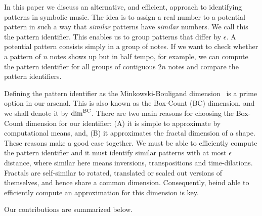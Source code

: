   In this paper we discuss an alternative, and efficient, approach to
identifying patterns in symbolic music. The idea is to assign a real
number to a potential pattern in such a way that \emph{similar}
patterns have \emph{similar} numbers. We call this the pattern
identifier.  This enables us to group patterns that differ by
$\epsilon$.  A potential pattern consists simply in a group of
notes. If we want to check whether a pattern of $n$ notes shows up but
in half tempo, for example, we can compute the pattern identifier for
all groups of contiguous $2n$ notes and compare the pattern
identifiers.  

  Defining the pattern identifier as the Minkowski-Bouligand
dimension~\cite{bouligand1928ensembles} is a prime option in our
arsenal.  This is also known as the Box-Count (BC) dimension, and we
shall denote it by $\mathrm{dim}^{\mathrm{BC}}$. There are two main reasons for choosing
the Box-Count dimension for our identifier: (A) it is simple to
approximate by computational means, and, (B) it approximates the
fractal dimension of a shape.  These reasons make a good case
together. We must be able to efficiently compute the pattern
identifier and it must identify similar patterns with at most
$\epsilon$ distance, where similar here means inversions,
transpositions and time-dilations. Fractals are self-similar to
rotated, translated or scaled out versions of themselves, and hence
share a common dimension. Consequently, beind able to efficiently
compute an approximation for this dimension is key.  







  Our contributions are summarized below.

